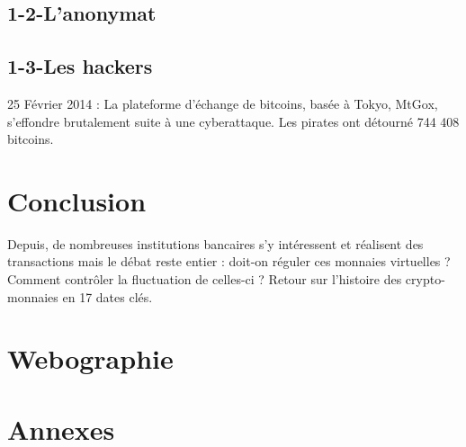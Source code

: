 \documentclass[12pt]{report}
\begin{document}
	    \subsection{1-2-L'anonymat}
	    \subsection{1-3-Les hackers}
25 Février 2014 : La plateforme d’échange de bitcoins, basée à Tokyo, MtGox, s’effondre brutalement suite à une cyberattaque. Les pirates ont détourné 744 408 bitcoins.

\newpage		
\section{Conclusion}
Depuis, de nombreuses institutions bancaires s’y intéressent et réalisent des transactions mais le débat reste entier : doit-on réguler ces monnaies virtuelles ? Comment contrôler la fluctuation de celles-ci ? Retour sur l’histoire des crypto-monnaies en 17 dates clés.

\newpage
\section{Webographie}

\newpage
\section{Annexes}
\end{document}
